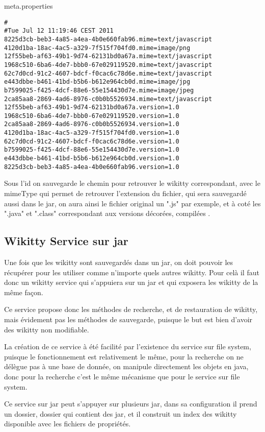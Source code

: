 meta.properties
\begin{verbatim}
#
#Tue Jul 12 11:19:46 CEST 2011
8225d3cb-beb3-4a85-a4ea-4b0e660fab96.mime=text/javascript
4120d1ba-18ac-4ac5-a329-7f515f704fd0.mime=image/png
12f55beb-af63-49b1-9d74-62131bd0a67a.mime=text/javascript
1968c510-6ba6-4de7-bbb0-67e029119520.mime=text/javascript
62c7d0cd-91c2-4607-bdcf-f0cac6c78d6e.mime=text/javascript
e443dbbe-b461-41bd-b5b6-b612e964cb0d.mime=image/jpg
b7599025-f425-4dcf-88e6-55e154430d7e.mime=image/jpeg
2ca85aa8-2869-4ad6-8976-c0b0b5526934.mime=text/javascript
12f55beb-af63-49b1-9d74-62131bd0a67a.version=1.0
1968c510-6ba6-4de7-bbb0-67e029119520.version=1.0
2ca85aa8-2869-4ad6-8976-c0b0b5526934.version=1.0
4120d1ba-18ac-4ac5-a329-7f515f704fd0.version=1.0
62c7d0cd-91c2-4607-bdcf-f0cac6c78d6e.version=1.0
b7599025-f425-4dcf-88e6-55e154430d7e.version=1.0
e443dbbe-b461-41bd-b5b6-b612e964cb0d.version=1.0
8225d3cb-beb3-4a85-a4ea-4b0e660fab96.version=1.0
\end{verbatim}


Sous l'id on sauvegarde le chemin pour retrouver le wikitty correspondant, 
avec le mimeType qui permet de retrouver l'extension du fichier, qui sera sauvegardé
aussi dans le jar, on aura ainsi le fichier original un ".js" par exemple, 
et à coté les ".java" et ".class" correspondant aux versions décorées, compilées	.


\subsection{Wikitty Service sur jar}

Une fois que les wikitty sont sauvegardés dans un jar, on doit pouvoir les 
récupérer pour les utiliser comme n'importe quels autres wikitty. Pour celà il 
faut donc un wikitty service qui s'appuiera sur un jar et qui exposera les 
wikitty de la même façon.

Ce service propose donc les méthodes de recherche, et de restauration de wikitty,
mais évidement pas les méthodes de sauvegarde, puisque le but est bien d'avoir
des wikitty non modifiable.

La création de ce service à été facilité par l'existence du service sur file
system, puisque le fonctionnement est relativement le même, pour la recherche
on ne délègue pas à une base de donnée, on manipule directement les objets en
java, donc pour la recherche c'est le même mécanisme que pour le service sur
file system.

Ce service sur jar peut s'appuyer sur plusieurs jar, dans sa configuration 
il prend un dossier, dossier qui contient des jar, et il construit un index 
des wikitty disponible avec les fichiers de propriétés. 


